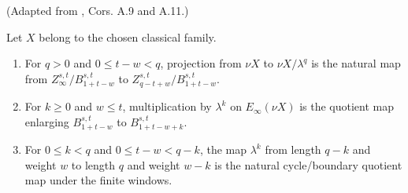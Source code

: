 \begin{theorem}
\label{frontier:Literature:b8fc8580677d}
(Adapted from \cite{BHS}, Cors. A.9 and A.11.)\par{}

Let $X$ belong to the chosen classical family.
\begin{enumerate}
\item For $q>0$ and $0\le t-w<q$, projection from $\nu X$ to $\nu X/\lambda^q$ is the natural map from $Z_\infty^{s,t}/B_{1+t-w}^{s,t}$ to $Z_{q-t+w}^{s,t}/B_{1+t-w}^{s,t}$.
\item For $k\ge0$ and $w\le t$, multiplication by $\lambda^k$ on $E_\infty(\nu X)$ is the quotient map enlarging $B_{1+t-w}^{s,t}$ to $B_{1+t-w+k}^{s,t}$.
\item For $0\le k<q$ and $0\le t-w<q-k$, the map $\lambda^k$ from length $q-k$ and weight $w$ to length $q$ and weight $w-k$ is the natural cycle/boundary quotient map under the finite windows.
\end{enumerate}
\end{theorem}
